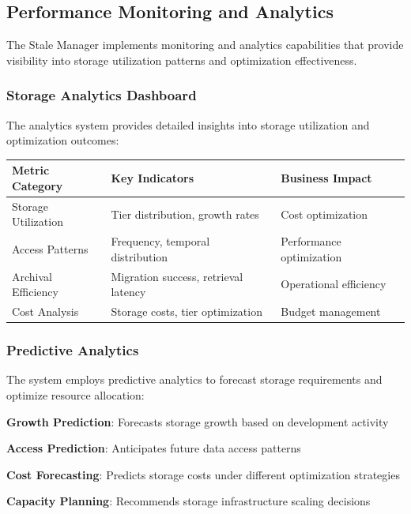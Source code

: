 \subsection*{Performance Monitoring and Analytics}

The Stale Manager implements monitoring and analytics capabilities that provide visibility into storage utilization patterns and optimization effectiveness.

\subsubsection*{Storage Analytics Dashboard}

The analytics system provides detailed insights into storage utilization and optimization outcomes:

\begin{center}
\begin{tabular}{@{}lll@{}}
\toprule
\textbf{Metric Category} & \textbf{Key Indicators} & \textbf{Business Impact} \\
\midrule
Storage Utilization & Tier distribution, growth rates & Cost optimization \\
Access Patterns & Frequency, temporal distribution & Performance optimization \\
Archival Efficiency & Migration success, retrieval latency & Operational efficiency \\
Cost Analysis & Storage costs, tier optimization & Budget management \\
\bottomrule
\end{tabular}
\end{center}

\subsubsection*{Predictive Analytics}

The system employs predictive analytics to forecast storage requirements and optimize resource allocation:

\begin{compactlist}
    \item \textbf{Growth Prediction}: Forecasts storage growth based on development activity
    \item \textbf{Access Prediction}: Anticipates future data access patterns
    \item \textbf{Cost Forecasting}: Predicts storage costs under different optimization strategies
    \item \textbf{Capacity Planning}: Recommends storage infrastructure scaling decisions
\end{compactlist}

